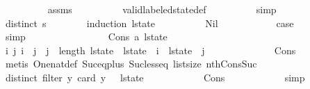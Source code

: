 \begin{isabellebody}
\ \ \ \ \ \ \ \ \isamarkupfalse%
\ assms\isanewline
\ \ \ \ \ \ \ \ \isamarkupfalse%
\ valid{\isacharunderscore}labeled{\isacharunderscore}state{\isacharunderscore}def\isanewline
\ \ \ \ \ \ \ \ \isamarkupfalse%
\ simp\isanewline
\ \ \ \ \ \ \isamarkupfalse%
\ \isamarkupfalse%
\ {\isachardoublequoteopen}distinct\ {\isacharquery}s{\isachardoublequoteclose}\isanewline
\ \ \ \ \ \ \isamarkupfalse%
\ {\isacharparenleft}induction\ l{\isacharunderscore}state{\isacharparenright}\isanewline
\ \ \ \ \ \ \ \ \isamarkupfalse%
\ Nil\isanewline
\ \ \ \ \ \ \ \ \isamarkupfalse%
\ \isamarkupfalse%
\ {\isacharquery}case\isanewline
\ \ \ \ \ \ \ \ \ \ \isamarkupfalse%
\ simp\isanewline
\ \ \ \ \ \ \isamarkupfalse%
\isanewline
\ \ \ \ \ \ \ \ \isamarkupfalse%
\ {\isacharparenleft}Cons\ a\ l{\isacharunderscore}state{\isacharparenright}\isanewline
\ \ \ \ \ \ \ \ \isamarkupfalse%
\ {\isachardoublequoteopen}{\isasymforall}i\ j{\isachardot}\ i\ {\isacharless}\ j\ {\isasymand}\ j\ {\isacharless}\ length\ l{\isacharunderscore}state\ {\isasymlongrightarrow}\ l{\isacharunderscore}state\ {\isacharbang}\ i\ {\isasyminter}\ l{\isacharunderscore}state\ {\isacharbang}\ j\ {\isacharequal}\ {\isacharbraceleft}{\isacharbraceright}{\isachardoublequoteclose}\isanewline
\ \ \ \ \ \ \ \ \ \ \isamarkupfalse%
\ Cons{\isacharparenleft}{}{\isacharparenright}\isanewline
\ \ \ \ \ \ \ \ \ \ \isamarkupfalse%
\ {\isacharparenleft}metis\ One{\isacharunderscore}nat{\isacharunderscore}def\ Suc{\isacharunderscore}eq{\isacharunderscore}plus{}\ Suc{\isacharunderscore}less{\isacharunderscore}eq\ list{\isachardot}size{\isacharparenleft}{}{\isacharparenright}\ nth{\isacharunderscore}Cons{\isacharunderscore}Suc{\isacharparenright}\isanewline
\ \ \ \ \ \ \ \ \isamarkupfalse%
\ {\isachardoublequoteopen}distinct\ {\isacharparenleft}filter\ {\isacharparenleft}{\isasymlambda}y{\isachardot}\ card\ y\ {\isasymnoteq}\ {}{\isacharparenright}\ l{\isacharunderscore}state{\isacharparenright}{\isachardoublequoteclose}\isanewline
\ \ \ \ \ \ \ \ \ \ \isamarkupfalse%
\ Cons{\isacharparenleft}{}{\isacharparenright}\isanewline
\ \ \ \ \ \ \ \ \ \ \isamarkupfalse%
\ simp\isanewline
\ \ \ \ \ \ \ \ \isamarkupfalse%
\isanewline
\ \ \ \ \ \ \ \ \isamarkupfalse%

\end{isabellebody}
